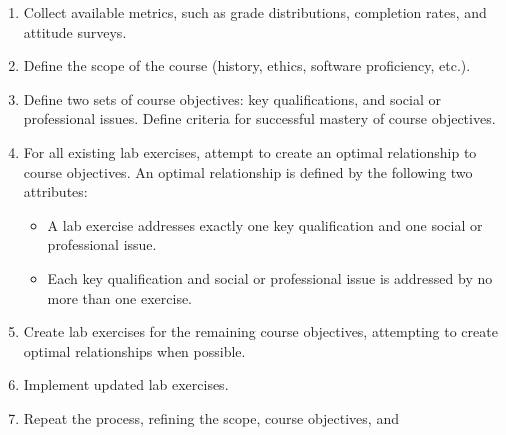 \begin{enumerate}
  \item Collect available metrics, such as grade distributions, completion
  rates, and attitude surveys.
  \item Define the scope of the course (history, ethics, software proficiency,
  etc.).
  \item Define two sets of course objectives:  key qualifications, and social
  or professional issues.  Define criteria for successful mastery of
  course objectives.
  \item For all existing lab exercises, attempt to create an optimal
  relationship to course objectives.  An optimal relationship is defined by the
  following two attributes:
  \begin{itemize}
    \item A lab exercise addresses exactly one key qualification and one
    social or professional issue.
    \item Each key qualification and social or professional issue is addressed
    by no more than one exercise.
  \end{itemize}
  \item Create lab exercises for the remaining course objectives, attempting to
  create optimal relationships when possible.
  \item Implement updated lab exercises.
  \item Repeat the process, refining the scope, course objectives, and 
\end{enumerate}






	
	
	

